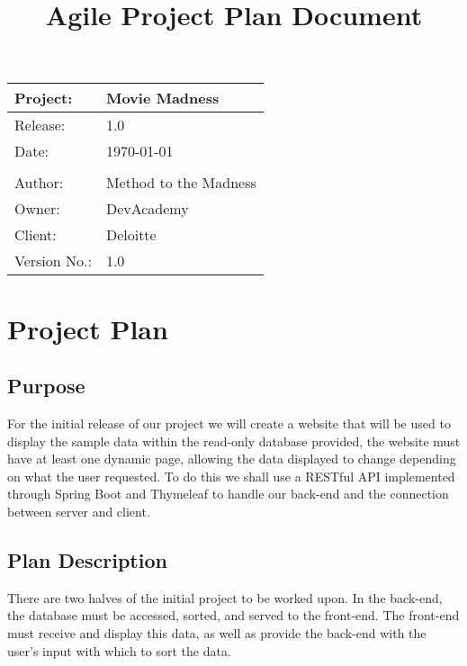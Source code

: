 \documentclass[a4paper,12pt]{article}
\title{\textbf{Agile Project Plan Document}}
\author{}
\date{}
\begin{document}
\thispagestyle{empty}
\renewcommand{\arraystretch}{2}

\maketitle

\begin{tabularx}{\textwidth}{|l|X|}
	\hline
		\textbf{{\huge Project:}} &
		\textbf{{\huge Movie Madness}}\\
	\hline
		Release: &
		1.0\\
	\hline
		Date: &
		\today \\
	\hline
		&
		\\
	\hline
		{\Large Author:} &
		{\Large Method to the Madness}\\
	\hline
		Owner: &
		DevAcademy\\
	\hline
		Client: &
		Deloitte\\
	\hline
		Version No.: &
		1.0\\
	\hline
	
\end{tabularx}

\newpage

\tableofcontents

\newpage

\section{Project Plan}

\subsection{Purpose}

For the initial release of our project we will create a website that will be used to display the sample data within the read-only database provided, the website must have at least one dynamic page, allowing the data displayed to change depending on what the user requested. To do this we shall use a RESTful API implemented through Spring Boot and Thymeleaf to handle our back-end and the connection between server and client.

\subsection{Plan Description}

There are two halves of the initial project to be worked upon. In the back-end, the database must be accessed, sorted, and served to the front-end. The front-end must receive and display this data, as well as provide the back-end with the user's input with which to sort the data.
\end{document}
